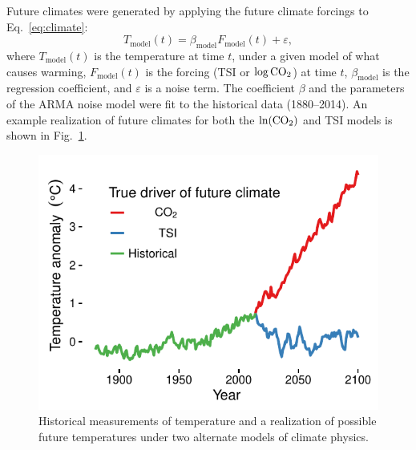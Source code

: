 \documentclass{wscpaperproc}\usepackage[]{graphicx}\usepackage[]{color}
\makeatletter
\def\maxwidth{ %
  \ifdim\Gin@nat@width>\linewidth
    \linewidth
  \else
    \Gin@nat@width
  \fi
}
\newenvironment{knitrout}{}{} %
\makeatother
\begin{document}
Future climates were generated by applying the future climate forcings to Eq.~\ref{eq:climate}:
\begin{equation}
T_{\text{model}}(t) = \beta_{\text{model}} F_{\text{model}}(t) + \varepsilon,
\label{eq:climate}
\end{equation}
where $T_{\text{model}}(t)$ is the temperature at time $t$, under a given model of what causes warming,
$F_{\text{model}}(t)$ is the forcing (TSI or $\log\ce{CO2}$) at time $t$,
$\beta_{\text{model}}$ is the regression coefficient, and
$\varepsilon$ is a noise term.
The coefficient $\beta$ and the parameters of the ARMA noise model were fit to the historical data (1880--2014).
An example realization of future climates for both the $\ln(\ce{CO2})$ and TSI models is shown in Fig.~\ref{fig:climateplot}.

\begin{knitrout}
\color{fgcolor}\begin{figure}

{\centering \includegraphics[width=\maxwidth]{figure/climateplot-1} 

}

\caption[Historical measurements of temperature and a realization of possible future temperatures under two alternate models of climate physics]{Historical measurements of temperature and a realization of possible future temperatures under two alternate models of climate physics.}\label{fig:climateplot}
\end{figure}


\end{knitrout}
\end{document}
